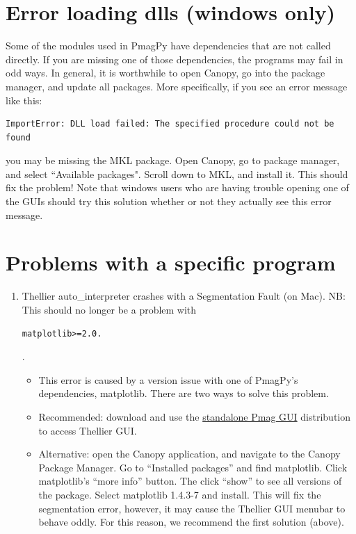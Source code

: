 \documentclass[11pt]{book}
\begin{document}
{{{\section{Error loading dlls (windows only)}
Some of the modules used in PmagPy have dependencies that are not called directly.  If you are missing one of those dependencies, the programs may fail in odd ways.  In general, it is worthwhile to open Canopy, go into the package manager, and update all packages.  More specifically, if you see an error message like this: \begin{verbatim}ImportError: DLL load failed: The specified procedure could not be found  \end{verbatim} you may be missing the MKL package.  Open Canopy, go to package manager, and select ``Available packages".  Scroll down to MKL, and install it.  This should fix the problem!  Note that windows users who are having trouble opening one of the GUIs should try this solution whether or not they actually see this error message.


\section{Problems with a specific program}
\begin{enumerate}
\item Thellier auto\_interpreter crashes with a Segmentation Fault (on Mac).  NB: This should no longer be a problem with \begin{verbatim}matplotlib>=2.0.\end{verbatim}.
  \begin{itemize}
  \item This error is caused by a version issue with one of PmagPy's dependencies, matplotlib.  There are two ways to solve this problem.
  \item Recommended: download and use the \href{#standalone}{standalone Pmag GUI} distribution to access Thellier GUI.
  \item Alternative: open the Canopy application, and navigate to the Canopy Package Manager.  Go to ``Installed packages'' and find matplotlib.  Click matplotlib's ``more info'' button.  The click ``show'' to see all versions of the package.  Select matplotlib 1.4.3-7 and install.  This will fix the segmentation error, however, it may cause the Thellier GUI menubar to behave oddly.  For this reason, we recommend the first solution (above).
  \end{itemize}
\end{enumerate}

}}}
\end{document}
